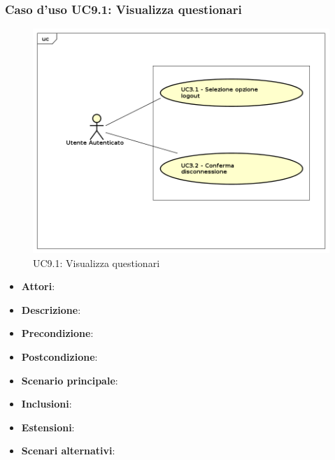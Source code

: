 	\subsubsection{Caso d'uso UC9.1: Visualizza questionari}
	\label{UC9.1}
	\begin{figure}[h]
		\centering
	\includegraphics[scale=0.7,keepaspectratio]{UML/UC9.png}
		\caption{UC9.1: Visualizza questionari}
	\end{figure}
	\FloatBarrier
	\begin{itemize}
		\item \textbf{Attori}: 
		\item \textbf{Descrizione}: 
		\item \textbf{Precondizione}: 
		\item \textbf{Postcondizione}: 
		\item \textbf{Scenario principale}:
		\item \textbf{Inclusioni}:
		\item \textbf{Estensioni}:
		\item \textbf{Scenari alternativi}:
	\end{itemize}
	
